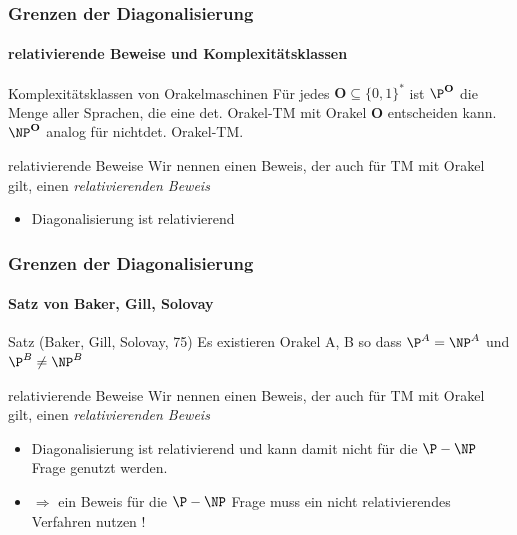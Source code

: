 \begin{frame}
	\frametitle{Grenzen der Diagonalisierung}
	\framesubtitle{relativierende Beweise und Komplexitätsklassen}
	\begin{KITinfoblock}{Komplexitätsklassen von Orakelmaschinen}
		Für jedes $\mathbf{O} \subseteq \{0,1\}^*$ ist ${\P}^{\mathbf{O}}$ die Menge
		aller Sprachen, die eine det. Orakel-TM mit Orakel $\mathbf{O}$ entscheiden
		kann.
		${\NP}^{\mathbf{O}}$ analog für nichtdet. Orakel-TM.
		
	\end{KITinfoblock}
	\bigskip 
	\pause
	\begin{KITinfoblock}{relativierende Beweise}
		Wir nennen einen Beweis, der auch für TM mit Orakel gilt, einen \newline
		\emph{relativierenden Beweis}
	\end{KITinfoblock}
	\begin{itemize}[<+->]
		\item Diagonalisierung ist relativierend
	\end{itemize}
\end{frame}
\begin{frame}
	\frametitle{Grenzen der Diagonalisierung}
	\framesubtitle{Satz von Baker, Gill, Solovay}
	\begin{KITinfoblock}{Satz (Baker, Gill, Solovay, 75)}
		Es existieren Orakel A, B so dass ${\P}^A = {\NP}^A$ und ${\P}^B \neq {\NP}^B$
	\end{KITinfoblock}
	\bigskip
	\pause
		\begin{KITinfoblock}{relativierende Beweise}
			Wir nennen einen Beweis, der auch für TM mit Orakel gilt, einen \newline
			\emph{relativierenden Beweis}
		\end{KITinfoblock}
		\pause
		\begin{itemize}[<+->]
		\item Diagonalisierung ist relativierend und kann damit nicht f\"ur die $\P
		- \NP$ Frage genutzt werden.
		\item $\Rightarrow$ ein Beweis für die $\P-\NP$ Frage muss ein nicht
		relativierendes Verfahren nutzen !
		\end{itemize}
		
		
	
\end{frame}




